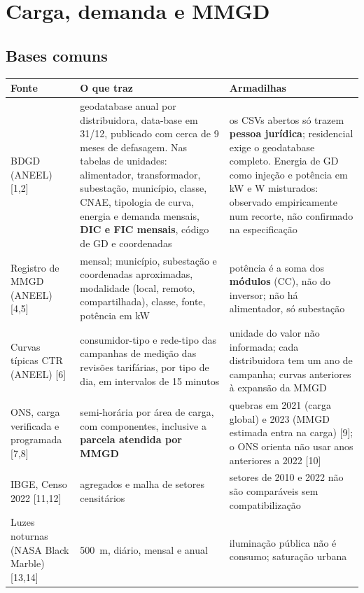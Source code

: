 
\section{Carga, demanda e MMGD}

\subsection*{Bases comuns}

\begin{table}[H]
\centering\small
\begin{tabularx}{\textwidth}{P{3.2cm} L P{4.2cm}}
\toprule
\textbf{Fonte} & \textbf{O que traz} & \textbf{Armadilhas} \\
\midrule
BDGD (ANEEL) [1,2] & geodatabase anual por distribuidora, data-base em 31/12, publicado com cerca de 9 meses de defasagem. Nas tabelas de unidades: alimentador, transformador, subestação, município, classe, CNAE, tipologia de curva, energia e demanda mensais, \textbf{DIC e FIC mensais}, código de GD e coordenadas & os CSVs abertos só trazem \textbf{pessoa jurídica}; residencial exige o geodatabase completo. Energia de GD como injeção e potência em kW e W misturados: observado empiricamente num recorte, não confirmado na especificação \\
Registro de MMGD (ANEEL) [4,5] & mensal; município, subestação e coordenadas aproximadas, modalidade (local, remoto, compartilhada), classe, fonte, potência em kW & potência é a soma dos \textbf{módulos} (CC), não do inversor; não há alimentador, só subestação \\
Curvas típicas CTR (ANEEL) [6] & consumidor-tipo e rede-tipo das campanhas de medição das revisões tarifárias, por tipo de dia, em intervalos de 15 minutos & unidade do valor não informada; cada distribuidora tem um ano de campanha; curvas anteriores à expansão da MMGD \\
ONS, carga verificada e programada [7,8] & semi-horária por área de carga, com componentes, inclusive a \textbf{parcela atendida por MMGD} & quebras em 2021 (carga global) e 2023 (MMGD estimada entra na carga) [9]; o ONS orienta não usar anos anteriores a 2022 [10] \\
IBGE, Censo 2022 [11,12] & agregados e malha de setores censitários & setores de 2010 e 2022 não são comparáveis sem compatibilização \\
Luzes noturnas (NASA Black Marble) [13,14] & 500~m, diário, mensal e anual & iluminação pública não é consumo; saturação urbana \\

\end{tabularx}
\end{table}
